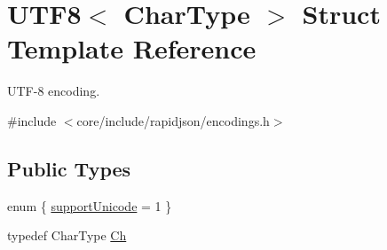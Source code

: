 \hypertarget{structUTF8}{}\section{U\+T\+F8$<$ Char\+Type $>$ Struct Template Reference}
\label{structUTF8}


U\+T\+F-\/8 encoding.  




{\ttfamily \#include $<$core/include/rapidjson/encodings.\+h$>$}

\subsection*{Public Types}
\begin{DoxyCompactItemize}
\item 
enum \{ \hyperlink{structUTF8_a6d7cd5f1f72db45d041344c35f47da74a1a78b02dbcc9ddfd12f86a51cddf8fad}{support\+Unicode} = 1
 \}
\item 
typedef Char\+Type \hyperlink{structUTF8_a8e78c8113f3660178d8121b7d3e55890}{Ch}
\end{DoxyCompactItemize}
